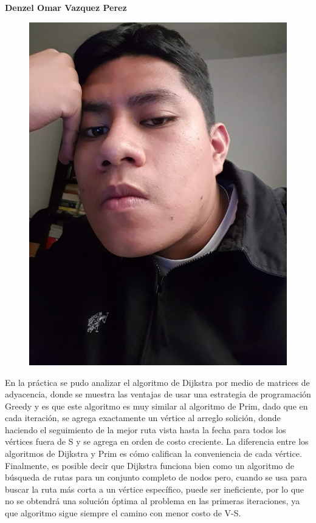 \documentclass[12pt,twoside]{article}
\begin{document}
    
    \textbf{\large Denzel Omar Vazquez Perez}
    \begin{figure}[H]
        \centering
        \includegraphics[angle=-90, scale= 0.05]{imagenes/foto2.jpg}
    \end{figure}
    En la pr\'actica se pudo analizar el algoritmo de Dijkstra por medio de    matrices de adyacencia, donde se muestra las ventajas de usar una estrategia de programaci\'on Greedy y es que este algoritmo es muy similar al algoritmo de Prim, dado que en cada iteración, se agrega exactamente un v\'ertice al arreglo solici\'on, donde haciendo el seguimiento de la mejor ruta vista hasta la fecha para todos los vértices fuera de S y se agrega en orden de costo creciente. La diferencia entre los algoritmos de Dijkstra y Prim es cómo califican la conveniencia de cada v\'ertice.\\
    
    Finalmente, es posible decir que Dijkstra funciona bien como un algoritmo de b\'usqueda de rutas para un conjunto completo de nodos pero, cuando se usa para buscar la ruta m\'as corta a un v\'ertice específico, puede ser ineficiente, por lo que no se obtendr\'a una soluci\'on \'optima al problema en las primeras iteraciones, ya que algoritmo sigue siempre el camino con menor costo de V-S.
\end{document}
